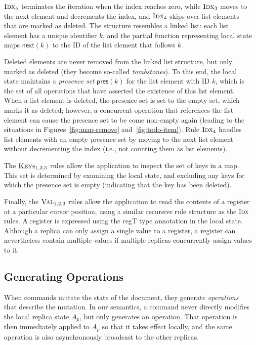 \documentclass[10pt,journal,compsoc]{IEEEtran}
\begin{document}
$\textsc{Idx}_5$ terminates the iteration when the index reaches zero, while $\textsc{Idx}_3$ moves to the next element and decrements the index, and $\textsc{Idx}_4$ skips over list elements that are marked as deleted. The structure resembles a linked list: each list element has a unique identifier $k$, and the partial function representing local state maps $\mathsf{next}(k)$ to the ID of the list element that follows $k$.

Deleted elements are never removed from the linked list structure, but only marked as deleted (they become so-called \emph{tombstones}). To this end, the local state maintains a \emph{presence set} $\mathsf{pres}(k)$ for the list element with ID $k$, which is the set of all operations that have asserted the existence of this list element. When a list element is deleted, the presence set is set to the empty set, which marks it as deleted; however, a concurrent operation that references the list element can cause the presence set to be come non-empty again (leading to the situations in Figures~\ref{fig:map-remove} and~\ref{fig:todo-item}). Rule $\textsc{Idx}_4$ handles list elements with an empty presence set by moving to the next list element without decrementing the index (i.e., not counting them as list elements).

The $\textsc{Keys}_{1,2,3}$ rules allow the application to inspect the set of keys in a map. This set is determined by examining the local state, and excluding any keys for which the presence set is empty (indicating that the key has been deleted).

Finally, the $\textsc{Val}_{1,2,3}$ rules allow the application to read the contents of a register at a particular cursor position, using a similar recursive rule structure as the \textsc{Idx} rules. A register is expressed using the \textsf{regT} type annotation in the local state. Although a replica can only assign a single value to a register, a register can nevertheless contain multiple values if multiple replicas concurrently assign values to it.

\subsection{Generating Operations}

When commands mutate the state of the document, they generate \emph{operations} that describe the mutation. In our semantics, a command never directly modifies the local replica state $A_p$, but only generates an operation. That operation is then immediately applied to $A_p$ so that it takes effect locally, and the same operation is also asynchronously broadcast to the other replicas.
\end{document}
